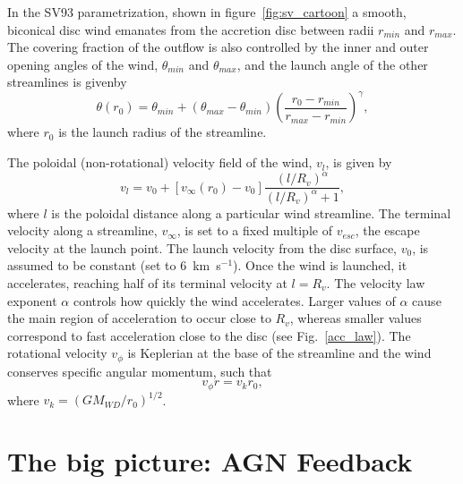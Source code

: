 In the SV93 parametrization, shown in figure~\ref{fig:sv_cartoon} 
a smooth, biconical disc wind emanates from the accretion disc between 
radii $r_{min}$ and $r_{max}$. The covering fraction of the outflow is 
also controlled by the inner and outer opening angles of the wind, $\theta_{min}$ and
$\theta_{max}$, and the launch angle of the other streamlines is givenby 
\begin{equation}
\theta(r_0) = \theta_{min} + (\theta_{max} - \theta_{min}) \left(\frac{r_0 - r_{min}}{r_{max} - r_{min}} \right)^{\gamma},
\label{theta}
\end{equation}
where $r_0$ is the launch radius of the streamline.

The poloidal (non-rotational) velocity field of the wind, $v_l$, is given by
\begin{equation}
v_l=v_0+\left[v_{\infty}(r_0)-v_0\right]\frac{\left(l/R_v\right)^{\alpha}}{\left(l/R_v\right)^{\alpha}+1},
\label{v_law}
\end{equation}
where $l$ is the poloidal distance along a particular wind
streamline. The terminal velocity along a streamline, $v_{\infty}$, is
set to a fixed multiple of $v_{esc}$, the escape velocity at the launch
point. The launch velocity from the disc surface, $v_0$, is assumed to
be constant (set to $6$~km~s$^{-1}$). Once the wind is launched, it
accelerates, reaching half of its terminal velocity at $l = R_v$. The
velocity law exponent $\alpha$ controls how quickly the wind
accelerates. Larger values of $\alpha$ cause the main region of 
acceleration to occur close to $R_v$, whereas smaller values
correspond to fast acceleration close to the disc (see
Fig.~\ref{acc_law}). The rotational velocity $v_\phi$ is 
Keplerian at the base of the streamline 
and the wind conserves specific angular momentum, such that
\begin{equation}
v_\phi r = v_{k} r_0,
\label{v_law}
\end{equation}
where $v_{k}=(GM_{WD}/r_0)^{1/2}$.




\section{The big picture: AGN Feedback}
\label{sec:agn_feedback}

